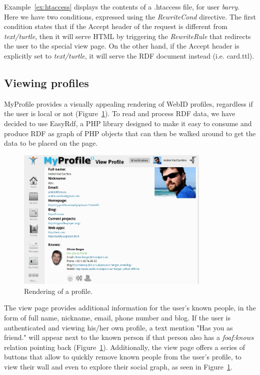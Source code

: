 Example~\ref{ex:htaccess} displays the contents of a .htaccess file, for user \textit{barry}. Here we have two conditions, expressed using the \textit{RewriteCond} directive. The first condition states that if the Accept header of the request is different from \textit{text/turtle}, then it will serve HTML by triggering the \textit{RewriteRule} that redirects the user to the special view page. On the other hand, if the Accept header is explicitly set to \textit{text/turtle}, it will serve the RDF document instead (i.e. card.ttl).

\subsection{Viewing profiles}
MyProfile provides a visually appealing rendering of WebID profiles, regardless if the user is local or not (Figure~\ref{fig:view_html}). To read and process RDF data, we have decided to use EasyRdf, a PHP library designed to make it easy to consume and produce RDF as graph of PHP objects that can then be walked around to get the data to be placed on the page.\\

\begin{figure}[h]
  \begin{center}
    \includegraphics[width=350px]{img/screens/view_html.jpg}
        \caption{Rendering of a profile.}
        \label{fig:view_html}
  \end{center}
\end{figure}

The view page provides additional information for the user's known people, in the form of full name, nickname, email, phone number and blog. If the user is authenticated and viewing his/her own profile, a text mention "Has you as friend." will appear next to the known person if that person also has a \textit{foaf:knows} relation pointing back (Figure~\ref{fig:view_html}). Additionally, the view page offers a series of buttons that allow to quickly remove known people from the user's profile, to view their wall and even to explore their social graph, as seen in Figure~\ref{fig:view_html}.\\

